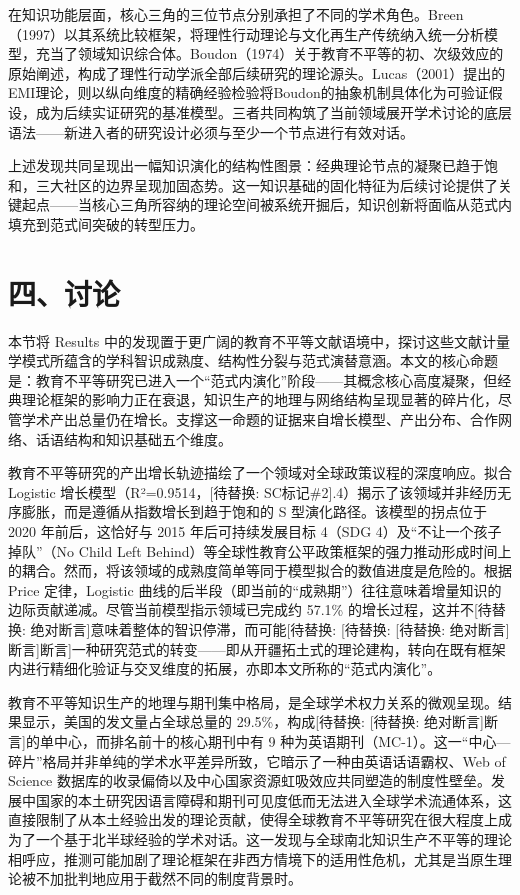 \documentclass[12pt,a4paper]{article}
\begin{document}
在知识功能层面，核心三角的三位节点分别承担了不同的学术角色。Breen（1997）以其系统比较框架，将理性行动理论与文化再生产传统纳入统一分析模型，充当了领域知识综合体。Boudon（1974）关于教育不平等的初、次级效应的原始阐述，构成了理性行动学派全部后续研究的理论源头。Lucas（2001）提出的EMI理论，则以纵向维度的精确经验检验将Boudon的抽象机制具体化为可验证假设，成为后续实证研究的基准模型。三者共同构筑了当前领域展开学术讨论的底层语法——新进入者的研究设计必须与至少一个节点进行有效对话。

上述发现共同呈现出一幅知识演化的结构性图景：经典理论节点的凝聚已趋于饱和，三大社区的边界呈现加固态势。这一知识基础的固化特征为后续讨论提供了关键起点——当核心三角所容纳的理论空间被系统开掘后，知识创新将面临从范式内填充到范式间突破的转型压力。

\section{四、讨论}

本节将 Results 中的发现置于更广阔的教育不平等文献语境中，探讨这些文献计量学模式所蕴含的学科智识成熟度、结构性分裂与范式演替意涵。本文的核心命题是：教育不平等研究已进入一个“范式内演化”阶段——其概念核心高度凝聚，但经典理论框架的影响力正在衰退，知识生产的地理与网络结构呈现显著的碎片化，尽管学术产出总量仍在增长。支撑这一命题的证据来自增长模型、产出分布、合作网络、话语结构和知识基础五个维度。

教育不平等研究的产出增长轨迹描绘了一个领域对全球政策议程的深度响应。拟合 Logistic 增长模型（R²=0.9514，[待替换: SC标记\#2].4）揭示了该领域并非经历无序膨胀，而是遵循从指数增长到趋于饱和的 S 型演化路径。该模型的拐点位于 2020 年前后，这恰好与 2015 年后可持续发展目标 4（SDG 4）及“不让一个孩子掉队”（No Child Left Behind）等全球性教育公平政策框架的强力推动形成时间上的耦合。然而，将该领域的成熟度简单等同于模型拟合的数值进度是危险的。根据 Price 定律，Logistic 曲线的后半段（即当前的“成熟期”）往往意味着增量知识的边际贡献递减。尽管当前模型指示领域已完成约 57.1\% 的增长过程，这并不[待替换: 绝对断言]意味着整体的智识停滞，而可能[待替换: [待替换: [待替换: 绝对断言]断言]断言]一种研究范式的转变——即从开疆拓土式的理论建构，转向在既有框架内进行精细化验证与交叉维度的拓展，亦即本文所称的“范式内演化”。

教育不平等知识生产的地理与期刊集中格局，是全球学术权力关系的微观呈现。结果显示，美国的发文量占全球总量的 29.5\%，构成[待替换: [待替换: 绝对断言]断言]的单中心，而排名前十的核心期刊中有 9 种为英语期刊（MC-1）。这一“中心—碎片”格局并非单纯的学术水平差异所致，它暗示了一种由英语话语霸权、Web of Science 数据库的收录偏倚以及中心国家资源虹吸效应共同塑造的制度性壁垒。发展中国家的本土研究因语言障碍和期刊可见度低而无法进入全球学术流通体系，这直接限制了从本土经验出发的理论贡献，使得全球教育不平等研究在很大程度上成为了一个基于北半球经验的学术对话。这一发现与全球南北知识生产不平等的理论相呼应，推测可能加剧了理论框架在非西方情境下的适用性危机，尤其是当原生理论被不加批判地应用于截然不同的制度背景时。
\end{document}
